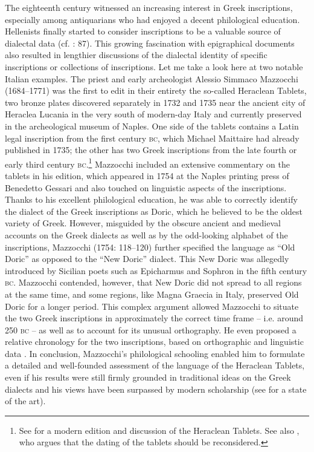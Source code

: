 The eighteenth century witnessed an increasing interest in Greek inscriptions, especially among antiquarians who had enjoyed a decent philological education. Hellenists finally started to consider inscriptions to be a valuable source of dialectal data (cf. \citealt{Walch1772}: 87). This growing fascination with epigraphical documents also resulted in lengthier discussions of the dialectal identity of specific inscriptions or collections of inscriptions. Let me take a look here at two notable Italian examples. The priest and early archeologist Alessio Simmaco Mazzocchi (1684–1771) was the first to edit in their entirety the so-called Heraclean Tablets, two bronze plates discovered separately in 1732 and 1735 near the ancient city of Heraclea Lucania in the very south of modern-day Italy and currently preserved in the archeological museum of Naples. One side of the tablets contains a Latin legal inscription from the first century \textsc{bc}, which Michael Maittaire had already published in 1735; the other has two Greek inscriptions from the late fourth or early third century \textsc{bc}.\footnote{See \citet{UguzzoniGhinatti1968} for a modern edition and discussion of the Heraclean Tablets. See also \citet{Weiss2016}, who argues that the dating of the tablets should be reconsidered.} Mazzocchi included an extensive commentary on the tablets in his edition, which appeared in 1754 at the Naples printing press of Benedetto Gessari and also touched on linguistic aspects of the inscriptions. Thanks to his excellent philological education, he was able to correctly identify the dialect of the Greek inscriptions as Doric, which he believed to be the oldest variety of Greek. However, misguided by the obscure ancient and medieval accounts on the Greek dialects as well as by the odd-looking alphabet of the inscriptions, Mazzocchi (1754: 118–120) further specified the language as “Old Doric” as opposed to the “New Doric” dialect. This New Doric was allegedly introduced by Sicilian poets such as Epicharmus and Sophron in the fifth century \textsc{bc}. Mazzocchi contended, however, that New Doric did not spread to all regions at the same time, and some regions, like Magna Graecia in Italy, preserved Old Doric for a longer period. This complex argument allowed Mazzocchi to situate the two Greek inscriptions in approximately the correct time frame – i.e. around 250 \textsc{bc} – as well as to account for its unusual orthography. He even proposed a relative chronology for the two inscriptions, based on orthographic and linguistic data \citep[135]{Mazzocchi1754}. In conclusion, Mazzocchi’s philological schooling enabled him to formulate a detailed and well-founded assessment of the language of the Heraclean Tablets, even if his results were still firmly grounded in traditional ideas on the Greek dialects and his views have been surpassed by modern scholarship (see \citealt{Weiss2016} for a state of the art).

